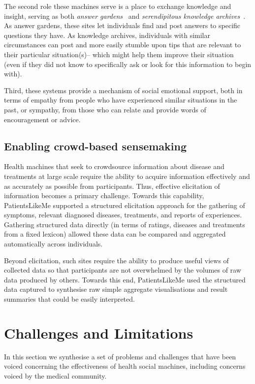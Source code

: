 \documentclass{sig-alternate}
\begin{document}
The second role these machines serve is a place to exchange knowledge
and insight, serving as both \emph{answer gardens}~\cite{answergarden}
and \emph{serendipitous knowledge archives}~\cite{knowledgearchive}.
As answer gardens, these sites let individuals find and post answers
to specific questions they have.  As knowledge archives, individuals
with similar circumstances can post and more easily stumble upon tips
that are relevant to their particular situation(s)-- which might help
them improve their situation (even if they did not know to
specifically ask or look for this information to begin with).

Third, these systems provide a mechanism of social emotional support,
both in terms of empathy from people who have experienced similar
situations in the past, or sympathy, from those who can relate and
provide words of encouragement or advice.

\subsection{Enabling crowd-based sensemaking}

Health machines that seek to crowdsource information about disease and
treatments at large scale require the ability to acquire information
effectively and as accurately as possible from participants.  Thus,
effective elicitation of information becomes a primary challenge.
Towards this capability, PatientsLikeMe supported a structured
elicitation approach for the gathering of symptoms, relevant diagnosed
diseases, treatments, and reports of experiences.  Gathering
structured data directly (in terms of ratings, diseases and treatments
from a fixed lexicon) allowed these data can be compared and
aggregated automatically across individuals.  

Beyond elicitation, such sites require the ability to produce useful
views of collected data so that participants are not overwhelmed by
the volumes of raw data produced by others.  Towards this end,
PatientsLikeMe used the structured data captured to synthesise raw
simple aggregate visualisations and result summaries that could be
easily interpreted.

\section{Challenges and Limitations}
\label{sec:limitations}

In this section we synthesise a set of problems and challenges that
have been voiced concerning the effectiveness of health social
machines, including concerns voiced by the medical community. 
\end{document}
